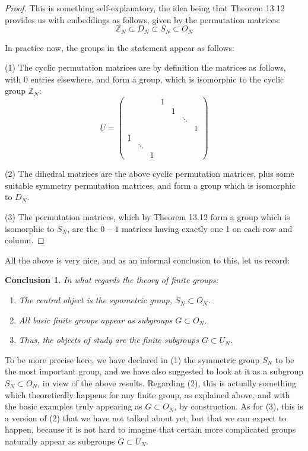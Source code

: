 \documentclass[12pt]{amsbook}
\newtheorem{conclusion}[theorem]{Conclusion}
\begin{document}
\begin{proof}
This is something self-explanatory, the idea being that Theorem 13.12 provides us with embeddings as follows, given by the permutation matrices:
$$\mathbb Z_N\subset D_N\subset S_N\subset O_N$$

In practice now, the groups in the statement appear as follows:

\medskip

(1) The cyclic permutation matrices are by definition the matrices as follows, with 0 entries elsewhere, and form a group, which is isomorphic to the cyclic group $\mathbb Z_N$:
$$U=\begin{pmatrix}
&&&1&&&\\
&&&&1&&\\
&&&&&\ddots&\\
&&&&&&1\\
1&&&&&\\
&\ddots&&&&&\\
&&1&&&
\end{pmatrix}$$

(2) The dihedral matrices are the above cyclic permutation matrices, plus some suitable symmetry permutation matrices, and form a group which is isomorphic to $D_N$.

\medskip

(3) The permutation matrices, which by Theorem 13.12 form a group which is isomorphic to $S_N$, are the $0-1$ matrices having exactly one 1 on each row and column.
\end{proof}

All the above is very nice, and as an informal conclusion to this, let us record:

\begin{conclusion}
In what regards the theory of finite groups:
\begin{enumerate}
\item The central object is the symmetric group, $S_N\subset O_N$.

\item All basic finite groups appear as subgroups $G\subset O_N$.

\item Thus, the objects of study are the finite subgroups $G\subset U_N$.
\end{enumerate}
\end{conclusion}

To be more precise here, we have declared in (1) the symmetric group $S_N$ to be the most important group, and we have also suggested to look at it as a subgroup $S_N\subset O_N$, in view of the above results. Regarding (2), this is actually something which theoretically happens for any finite group, as explained above, and with the basic examples truly appearing as $G\subset O_N$, by construction. As for (3), this is a version of (2) that we have not talked about yet, but that we can expect to happen, because it is not hard to imagine that certain more complicated groups naturally appear as subgroups $G\subset U_N$.
\end{document}
